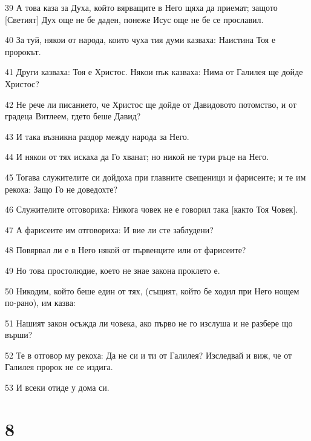 \par 39 А това каза за Духа, който вярващите в Него щяха да приемат; защото [Светият] Дух още не бе даден, понеже Исус още не бе се прославил.
\par 40 За туй, някои от народа, които чуха тия думи казваха: Наистина Тоя е пророкът.
\par 41 Други казваха: Тоя е Христос. Някои пък казваха: Нима от Галилея ще дойде Христос?
\par 42 Не рече ли писанието, че Христос ще дойде от Давидовото потомство, и от градеца Витлеем, гдето беше Давид?
\par 43 И така възникна раздор между народа за Него.
\par 44 И някои от тях искаха да Го хванат; но никой не тури ръце на Него.
\par 45 Тогава служителите си дойдоха при главните свещеници и фарисеите; и те им рекоха: Защо Го не доведохте?
\par 46 Служителите отговориха: Никога човек не е говорил така [както Тоя Човек].
\par 47 А фарисеите им отговориха: И вие ли сте заблудени?
\par 48 Повярвал ли е в Него някой от първенците или от фарисеите?
\par 49 Но това простолюдие, което не знае закона проклето е.
\par 50 Никодим, който беше един от тях, (същият, който бе ходил при Него нощем по-рано), им казва:
\par 51 Нашият закон осъжда ли човека, ако първо не го изслуша и не разбере що върши?
\par 52 Те в отговор му рекоха: Да не си и ти от Галилея? Изследвай и виж, че от Галилея пророк не се издига.
\par 53 И всеки отиде у дома си.

\chapter{8}

